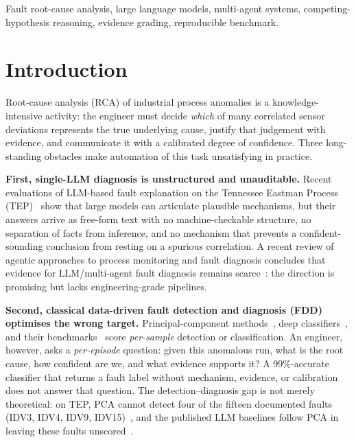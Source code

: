 \documentclass[journal]{IEEEtran}
\begin{document}
\begin{IEEEkeywords}
Fault root-cause analysis, large language models, multi-agent systems, competing-hypothesis reasoning, evidence grading, reproducible benchmark.
\end{IEEEkeywords}

\section{Introduction}
\label{sec:intro}

Root-cause analysis (RCA) of industrial process anomalies is a knowledge-intensive activity: the engineer must decide \emph{which} of many correlated sensor deviations represents the true underlying cause, justify that judgement with evidence, and communicate it with a calibrated degree of confidence. Three long-standing obstacles make automation of this task unsatisfying in practice.

\textbf{First, single-LLM diagnosis is unstructured and unauditable.} Recent evaluations of LLM-based fault explanation on the Tennessee Eastman Process (TEP)~\cite{khan2024faultexplainer} show that large models can articulate plausible mechanisms, but their answers arrive as free-form text with no machine-checkable structure, no separation of facts from inference, and no mechanism that prevents a confident-sounding conclusion from resting on a spurious correlation. A recent review of agentic approaches to process monitoring and fault diagnosis concludes that evidence for LLM/multi-agent fault diagnosis remains scarce~\cite{agentic2025review}: the direction is promising but lacks engineering-grade pipelines.

\textbf{Second, classical data-driven fault detection and diagnosis (FDD) optimises the wrong target.} Principal-component methods~\cite{goldenberg2019fault}, deep classifiers~\cite{tuli2022tranad,pozdnyakov2024adversarial}, and their benchmarks~\cite{rieth2023additional} score \emph{per-sample} detection or classification. An engineer, however, asks a \emph{per-episode} question: given this anomalous run, what is the root cause, how confident are we, and what evidence supports it? A 99\%-accurate classifier that returns a fault label without mechanism, evidence, or calibration does not answer that question. The detection--diagnosis gap is not merely theoretical: on TEP, PCA cannot detect four of the fifteen documented faults (IDV3, IDV4, IDV9, IDV15)~\cite{chiang2001fault}, and the published LLM baselines follow PCA in leaving these faults unscored~\cite{khan2024faultexplainer}.
\end{document}
